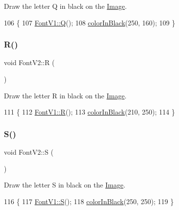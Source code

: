 Draw the letter Q in black on the \mbox{\hyperlink{class_image}{Image}}. 


\begin{DoxyCode}
106                \{
107     \mbox{\hyperlink{class_font_v1_af7ffd76bf02756d0d1e2d3eab4c65c40}{FontV1::Q}}();
108     \mbox{\hyperlink{class_font_v2_a04f2501961bc286ce70fbb6a840b0e8a}{colorInBlack}}(250, 160);
109 \}
\end{DoxyCode}
\mbox{\label{class_font_v2_a852e482795dc7557137419b713711774}} 
\subsubsection{\texorpdfstring{R()}{R()}}
{\footnotesize\ttfamily void Font\+V2\+::R (\begin{DoxyParamCaption}{ }\end{DoxyParamCaption})}



Draw the letter R in black on the \mbox{\hyperlink{class_image}{Image}}. 


\begin{DoxyCode}
111                \{
112     \mbox{\hyperlink{class_font_v1_ab3f9a7e62f7d08792d9028da68f5787e}{FontV1::R}}();
113     \mbox{\hyperlink{class_font_v2_a04f2501961bc286ce70fbb6a840b0e8a}{colorInBlack}}(210, 250);
114 \}
\end{DoxyCode}
\mbox{\label{class_font_v2_adcccd6f866d51bb27568d8c4c465551f}} 
\subsubsection{\texorpdfstring{S()}{S()}}
{\footnotesize\ttfamily void Font\+V2\+::S (\begin{DoxyParamCaption}{ }\end{DoxyParamCaption})}



Draw the letter S in black on the \mbox{\hyperlink{class_image}{Image}}. 


\begin{DoxyCode}
116                \{
117     \mbox{\hyperlink{class_font_v1_ab6daa08377051d5af458003c665cfc09}{FontV1::S}}();
118     \mbox{\hyperlink{class_font_v2_a04f2501961bc286ce70fbb6a840b0e8a}{colorInBlack}}(250, 250);
119 \}
\end{DoxyCode}
\mbox{\label{class_font_v2_a0311eabb37bc231b9b0c0a13cdc0e562}} 
